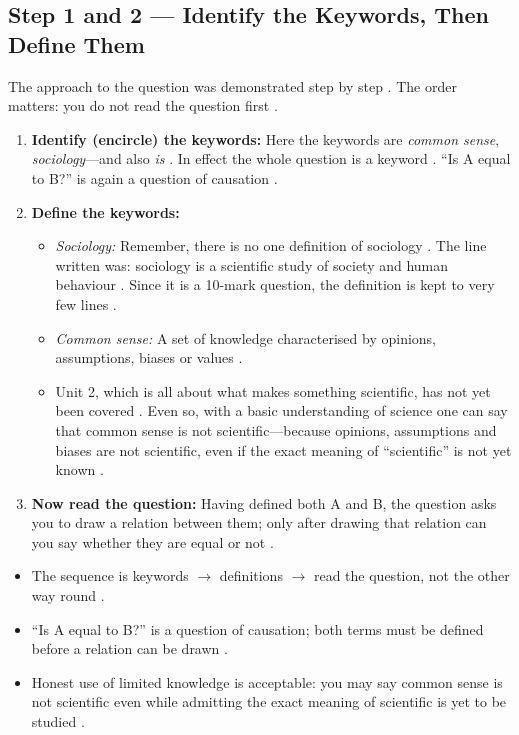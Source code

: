 \subsection{Step 1 and 2 --- Identify the Keywords, Then Define Them}
The approach to the question was demonstrated step by step . The order matters: you do not read the question first .
\begin{enumerate}
    \item \textbf{Identify (encircle) the keywords:}  Here the keywords are \textit{common sense}, \textit{sociology}---and also \textit{is} . In effect the whole question is a keyword . ``Is A equal to B?'' is again a question of causation .
    \item \textbf{Define the keywords:} 
    \begin{itemize}
        \item \textit{Sociology:} Remember, there is no one definition of sociology . The line written was: sociology is a scientific study of society and human behaviour . Since it is a 10-mark question, the definition is kept to very few lines .
        \item \textit{Common sense:} A set of knowledge characterised by opinions, assumptions, biases or values .
        \item Unit 2, which is all about what makes something scientific, has not yet been covered . Even so, with a basic understanding of science one can say that common sense is not scientific---because opinions, assumptions and biases are not scientific, even if the exact meaning of ``scientific'' is not yet known .
    \end{itemize}
    \item \textbf{Now read the question:}  Having defined both A and B, the question asks you to draw a relation between them; only after drawing that relation can you say whether they are equal or not .
\end{enumerate}

\begin{CriticalPoint}
\begin{itemize}
    \item The sequence is keywords $\rightarrow$ definitions $\rightarrow$ read the question, not the other way round .
    \item ``Is A equal to B?'' is a question of causation; both terms must be defined before a relation can be drawn .
    \item Honest use of limited knowledge is acceptable: you may say common sense is not scientific even while admitting the exact meaning of scientific is yet to be studied .
\end{itemize}
\end{CriticalPoint}

